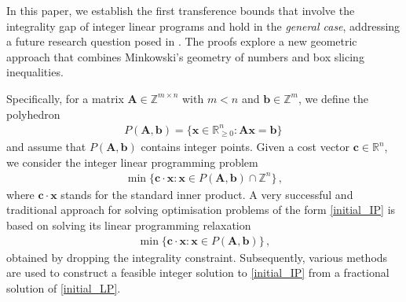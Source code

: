 \documentclass[runningheads]{llncs}
\newcommand{\ve}{\boldsymbol}
\newcommand{\be}{\begin{eqnarray}}
\newcommand{\bea}{\begin{eqnarray*}}
\newcommand{\ee}{\end{eqnarray}}
\newcommand{\eea}{\end{eqnarray*}}
\newcommand{\rank}{\mathrm{rank}}
\newcommand{\R}{\mathbb R}
\newcommand{\Z}{\mathbb Z}
\newcommand{\KP}{{P}}
\renewcommand\>{\rangle}
\newcommand\<{\langle}
\newcommand\0{\mathbf{0}}
\newcommand\bb{\ve b}%
\newcommand\cc{\ve c}%
\newcommand\xx{\ve x}%
\renewcommand\AA{\ve A}%
\begin{document}

In this paper, we establish the first transference bounds that involve the integrality gap of integer linear programs and hold in the {\em general case}, addressing a future research question posed in  \cite{ACHW}. The proofs explore a new geometric approach that combines Minkowski's geometry of numbers and box slicing inequalities.


Specifically, 
for a matrix $\AA \in \Z^{m\times n}$ with $m<n$ and $\ve b \in \Z^m$,
%
we define the polyhedron
%
\bea
\KP(\AA, {\ve b})=\{{\ve x}\in \R^n_{\ge 0}: \AA{\ve x}={\ve b}\}\,
\eea
%
and assume that $\KP(\AA, {\ve b})$ contains integer points. 
%
Given a cost vector $\cc\in\R^{n}$, we consider the integer linear programming
problem 
\begin{eqnarray}
\min\{\cc\cdot\xx:\xx\in\KP(\AA,\bb)\cap\Z^{n}\}\,,\label{initial_IP}
\end{eqnarray}
where $\cc\cdot\xx$ stands for the standard inner product.
A very successful and traditional approach for solving optimisation problems 
of the form \eqref{initial_IP} is based on solving its
linear programming relaxation %
\begin{eqnarray}
\min\{\cc\cdot\xx:\xx\in\KP(\AA,\bb)\}\,,\label{initial_LP}
\end{eqnarray}
obtained
by dropping the integrality constraint. Subsequently,  various methods are used to construct a feasible integer solution to \eqref{initial_IP} from a fractional solution of \eqref{initial_LP}.
\end{document}
